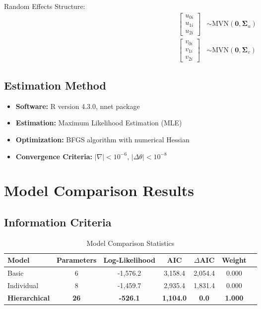 \documentclass[11pt,a4paper]{article}
\begin{document}
Random Effects Structure:
\begin{align}
\begin{bmatrix} u_{0i} \\ u_{1i} \\ u_{2i} \end{bmatrix} &\sim \text{MVN}\left(\mathbf{0}, \boldsymbol{\Sigma}_u\right)\\
\begin{bmatrix} v_{0i} \\ v_{1i} \\ v_{2i} \end{bmatrix} &\sim \text{MVN}\left(\mathbf{0}, \boldsymbol{\Sigma}_v\right)
\end{align}

\subsection{Estimation Method}
\begin{itemize}
    \item \textbf{Software:} R version 4.3.0, nnet package
    \item \textbf{Estimation:} Maximum Likelihood Estimation (MLE)
    \item \textbf{Optimization:} BFGS algorithm with numerical Hessian
    \item \textbf{Convergence Criteria:} $|\nabla| < 10^{-6}$, $|\Delta\theta| < 10^{-8}$
\end{itemize}

\section{Model Comparison Results}

\subsection{Information Criteria}
\begin{table}[H]
\centering
\caption{Model Comparison Statistics}
\begin{tabular}{lcccccc}
\toprule
Model & Parameters & Log-Likelihood & AIC & $\Delta$AIC & Weight \\
\midrule
Basic & 6 & -1,576.2 & 3,158.4 & 2,054.4 & 0.000 \\
Individual & 8 & -1,459.7 & 2,935.4 & 1,831.4 & 0.000 \\
\textbf{Hierarchical} & \textbf{26} & \textbf{-526.1} & \textbf{1,104.0} & \textbf{0.0} & \textbf{1.000} \\
\bottomrule
\end{tabular}
\end{table}
\end{document}
